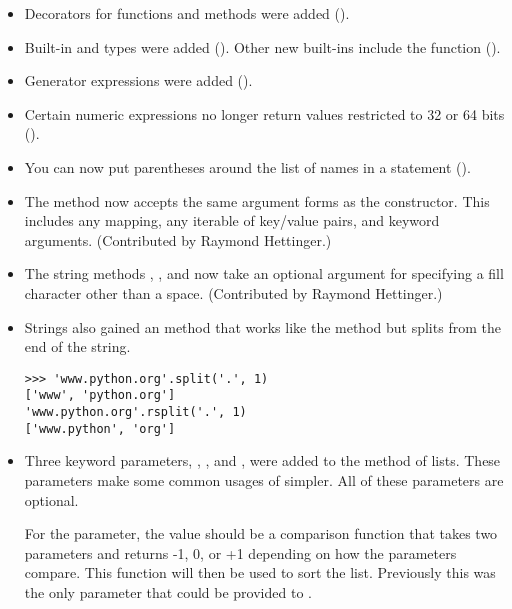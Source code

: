 \documentclass{howto}
\begin{document}
\begin{itemize}

\item Decorators for functions and methods were added ().

\item Built-in  and  types were 
added ().  Other new built-ins include the  function ().

\item Generator expressions were added ().

\item Certain numeric expressions no longer return values restricted to 32 or 64 bits ().

\item You can now put parentheses around the list of names in a
 statement ().

\item The  method now accepts the same
argument forms as the  constructor.  This includes any
mapping, any iterable of key/value pairs, and keyword arguments.
(Contributed by Raymond Hettinger.)

\item The string methods , , and
 now take an optional argument for specifying a
fill character other than a space.
(Contributed by Raymond Hettinger.)

\item Strings also gained an  method that
works like the  method but splits from the end of
the string.  

\begin{verbatim}
>>> 'www.python.org'.split('.', 1)
['www', 'python.org']
'www.python.org'.rsplit('.', 1)
['www.python', 'org']        
\end{verbatim}      

\item Three keyword parameters, , , and
, were added to the  method of lists.
These parameters make some common usages of  simpler.
All of these parameters are optional.

For the  parameter, the value should be a comparison function
that takes two parameters and returns -1, 0, or +1 depending on how
the parameters compare.  This function will then be used to sort the
list.  Previously this was the only parameter that could be provided
to .


\end{itemize}
\end{document}
